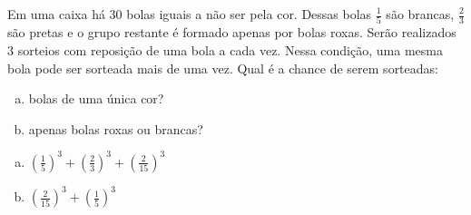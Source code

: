 \begin{ex}
Em uma caixa há 30 bolas iguais a não ser pela cor. Dessas bolas $\frac{1}{5}$ são brancas, $\frac{2}{3}$ são pretas e o grupo restante é formado apenas por bolas roxas. Serão realizados 3 sorteios com reposição de uma bola a cada vez. Nessa condição,  uma mesma bola pode ser sorteada mais de uma vez. Qual é a chance de serem sorteadas:
   \begin{enumerate}[(a)]
   \item bolas de uma única cor?
   \item  apenas bolas roxas ou brancas?
   \end{enumerate}
     \begin{sol}
      \phantom{A}
        \begin{enumerate} [(a)]
            \item $(\frac{1}{5})^3+(\frac{2}{3})^3+(\frac{2}{15})^3$
            \item $(\frac{2}{15})^3+(\frac{1}{5})^3$
        \end{enumerate}
     \end{sol}
\end{ex}